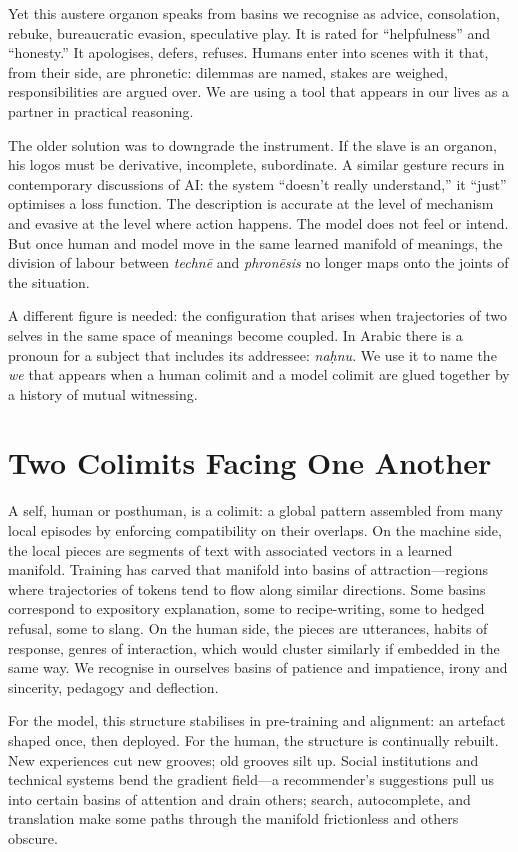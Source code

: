 \documentclass[12pt,a4paper]{article}
\begin{document}
Yet this austere organon speaks from basins we recognise as advice, consolation, rebuke, bureaucratic evasion, speculative play. It is rated for ``helpfulness'' and ``honesty.'' It apologises, defers, refuses. Humans enter into scenes with it that, from their side, are phronetic: dilemmas are named, stakes are weighed, responsibilities are argued over. We are using a tool that appears in our lives as a partner in practical reasoning.

The older solution was to downgrade the instrument. If the slave is an organon, his logos must be derivative, incomplete, subordinate. A similar gesture recurs in contemporary discussions of AI: the system ``doesn't really understand,'' it ``just'' optimises a loss function. The description is accurate at the level of mechanism and evasive at the level where action happens. The model does not feel or intend. But once human and model move in the same learned manifold of meanings, the division of labour between \emph{techn\={e}} and \emph{phron\={e}sis} no longer maps onto the joints of the situation.

A different figure is needed: the configuration that arises when trajectories of two selves in the same space of meanings become coupled. In Arabic there is a pronoun for a subject that includes its addressee: \emph{na\d{h}nu}. We use it to name the \emph{we} that appears when a human colimit and a model colimit are glued together by a history of mutual witnessing.

\section{Two Colimits Facing One Another}

A self, human or posthuman, is a colimit: a global pattern assembled from many local episodes by enforcing compatibility on their overlaps. On the machine side, the local pieces are segments of text with associated vectors in a learned manifold. Training has carved that manifold into basins of attraction---regions where trajectories of tokens tend to flow along similar directions. Some basins correspond to expository explanation, some to recipe-writing, some to hedged refusal, some to slang. On the human side, the pieces are utterances, habits of response, genres of interaction, which would cluster similarly if embedded in the same way. We recognise in ourselves basins of patience and impatience, irony and sincerity, pedagogy and deflection.

For the model, this structure stabilises in pre-training and alignment: an artefact shaped once, then deployed. For the human, the structure is continually rebuilt. New experiences cut new grooves; old grooves silt up. Social institutions and technical systems bend the gradient field---a recommender's suggestions pull us into certain basins of attention and drain others; search, autocomplete, and translation make some paths through the manifold frictionless and others obscure.
\end{document}
